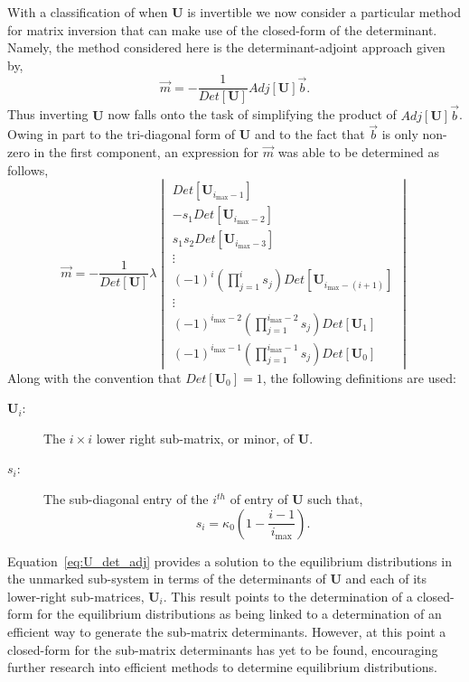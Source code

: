 \documentclass[review]{elsarticle}
\newcommand{\imax}{\ensuremath{i_{\max}}\xspace}
\let\bs\boldsymbol
\begin{document}
With a classification of when $\bs{U}$ is invertible we now consider a particular method for matrix inversion that can make use of the closed-form of the determinant.
Namely, the method considered here is the determinant-adjoint approach given by,
\begin{equation*}
\vec{m}=-\frac{1}{Det[\bs{U}]}Adj[\bs{U}]\vec{b}.
\end{equation*}
Thus inverting $\bs{U}$ now falls onto the task of simplifying the product of $Adj[\bs{U}]\vec{b}$.
Owing in part to the tri-diagonal form of $\bs{U}$ and to the fact that $\vec{b}$ is only non-zero in the first component, an expression for $\vec{m}$ was able to be determined as follows,
\begin{equation}\label{eq:U_det_adj}
\vec{m}=-\frac{1}{Det[\bs{U}]}\lambda\begin{vmatrix}Det[\bs{U}_{\imax-1}]\\
-s_{1}Det[\bs{U}_{\imax-2}]\\
s_{1}s_{2}Det[\bs{U}_{\imax-3}]\\
\vdots\\
(-1)^{i}(\prod_{j=1}^{i}s_{j})Det[\bs{U}_{\imax-(i+1)}]\\
\vdots\\
(-1)^{\imax-2}(\prod_{j=1}^{\imax-2}s_{j})Det[\bs{U}_1]\\
(-1)^{\imax-1}(\prod_{j=1}^{\imax-1}s_{j})Det[\bs{U}_0]
\end{vmatrix}
\end{equation}
Along with the convention that $Det[\bs{U}_0]=1$, the following definitions are used:
\begin{description}
\item[{ $\bs{U}_{i}$:}] The $i\times i$ lower right sub-matrix, or minor, of $\bs{U}$.  
\item[{ $s_{i}$:}] The sub-diagonal entry of the $i^{th}$ of entry of $\bs{U}$ such that, \begin{equation*} s_{i}=\kappa_0\left(1-\frac{i-1}{\imax}\right). \end{equation*}
\end{description}
Equation~\ref{eq:U_det_adj} provides a solution to the equilibrium distributions in the unmarked sub-system in terms of the determinants of $\bs{U}$ and each of its lower-right sub-matrices, $\bs{U}_i$.
This result points to the determination of a closed-form for the equilibrium distributions as being linked to a determination of an efficient way to generate the sub-matrix determinants.
However, at this point a closed-form for the sub-matrix determinants has yet to be found, encouraging further research into efficient methods to determine equilibrium distributions.
\end{document}
